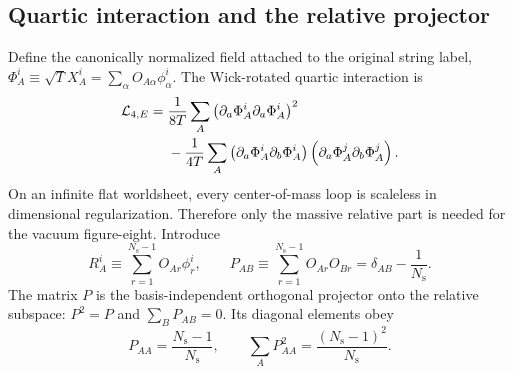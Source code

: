 \subsection{Quartic interaction and the relative projector}

Define the canonically normalized field attached to the original string
label, $\Phi_A^i\equiv\sqrt{T}X_A^i=\sum_\alpha O_{A\alpha}\phi_\alpha^i$.
The Wick-rotated quartic interaction is
\begin{align}
  \mathcal L_{4,E}
  ={}&\frac{1}{8T}\sum_A
    \left(\partial_a\Phi_A^i\partial_a\Phi_A^i\right)^2
  \notag\\
  &-\frac{1}{4T}\sum_A
    \left(\partial_a\Phi_A^i\partial_b\Phi_A^i\right)
    \left(\partial_a\Phi_A^j\partial_b\Phi_A^j\right).
  \label{eq:n-string-quartic-euclidean}
\end{align}
On an infinite flat worldsheet, every center-of-mass loop is scaleless in
dimensional regularization.  Therefore only the massive relative part is
needed for the vacuum figure-eight.  Introduce
\begin{equation}
  R_A^i\equiv\sum_{r=1}^{N_{\mathrm s}-1}O_{Ar}\phi_r^i,
  \qquad
  P_{AB}\equiv\sum_{r=1}^{N_{\mathrm s}-1}O_{Ar}O_{Br}
  =\delta_{AB}-\frac{1}{N_{\mathrm s}}.
  \label{eq:n-string-relative-field-projector}
\end{equation}
The matrix $P$ is the basis-independent orthogonal projector onto the relative
subspace: $P^2=P$ and $\sum_BP_{AB}=0$.  Its diagonal elements obey
\begin{equation}
  P_{AA}=\frac{N_{\mathrm s}-1}{N_{\mathrm s}},
  \qquad
  \sum_AP_{AA}^2=\frac{(N_{\mathrm s}-1)^2}{N_{\mathrm s}}.
  \label{eq:n-string-projector-diagonal-factor}
\end{equation}

